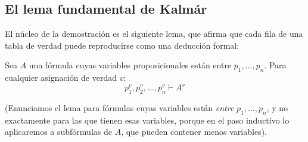 \subsection{El lema fundamental de Kalmár}

El núcleo de la demostración es el siguiente lema, que afirma que cada fila de una tabla de verdad puede reproducirse como una deducción formal:

\begin{lemma}\label{lema_kalmar}
Sea $A$ una fórmula cuyas variables proposicionales están entre $p_1, \dots, p_n$. Para cualquier asignación de verdad $v$:
\[
p_1^v, p_2^v, \dots, p_n^v \vdash A^v
\]
\end{lemma}
\noindent{}(Enunciamos el lema para fórmulas cuyas variables están \emph{entre} $p_1, \dots, p_n$, y no exactamente para las que tienen esas variables, porque en el paso inductivo lo aplicaremos a subfórmulas de $A$, que pueden contener menos variables).


